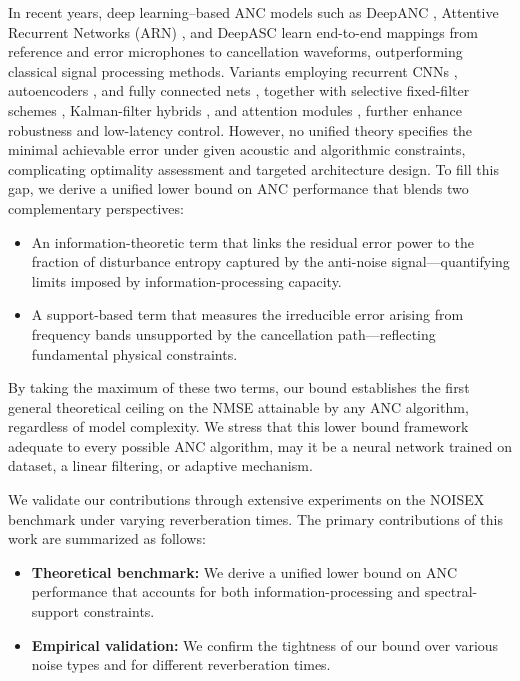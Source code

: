 \documentclass{article}
\begin{document}
In recent years, deep learning–based ANC models such as DeepANC \cite{zhang2021deep}, Attentive Recurrent Networks (ARN) \cite{pandey2022self}, and DeepASC \cite{mishaly2025deepactivespeechcancellation} learn end-to-end mappings from reference and error microphones to cancellation waveforms, outperforming classical signal processing methods. Variants employing recurrent CNNs \cite{park2023had,mostafavi2023deep}, autoencoders \cite{singh2024enhancing}, and fully connected nets \cite{pike2023generalized}, together with selective fixed-filter schemes \cite{shi2020feedforward,park2023integrated}, Kalman-filter hybrids \cite{luo2023gfanc}, and attention modules \cite{zhang2023low}, further enhance robustness and low-latency control. However, no unified theory specifies the minimal achievable error under given acoustic and algorithmic constraints, complicating optimality assessment and targeted architecture design. To fill this gap, we derive a unified lower bound on ANC performance that blends two complementary perspectives:
\begin{itemize}
    \item An information-theoretic term that links the residual error power to the fraction of disturbance entropy captured by the anti-noise signal—quantifying limits imposed by information-processing capacity.
    \item A support-based term that measures the irreducible error arising from frequency bands unsupported by the cancellation path—reflecting fundamental physical constraints.
\end{itemize}

By taking the maximum of these two terms, our bound establishes the first general theoretical ceiling on the NMSE attainable by any ANC algorithm, regardless of model complexity. We stress that this lower bound framework adequate to every possible ANC algorithm, may it be a neural network trained on dataset, a linear filtering, or adaptive mechanism.


We validate our contributions through extensive experiments on the NOISEX benchmark under varying reverberation times. The primary contributions of this work are summarized as follows:
\begin{itemize}
    \item \textbf{Theoretical benchmark:} We derive a unified lower bound on ANC performance that accounts for both information-processing and spectral-support constraints.
    \item \textbf{Empirical validation:} We confirm the tightness of our bound over various noise types and for different reverberation times.
\end{itemize}
\end{document}
